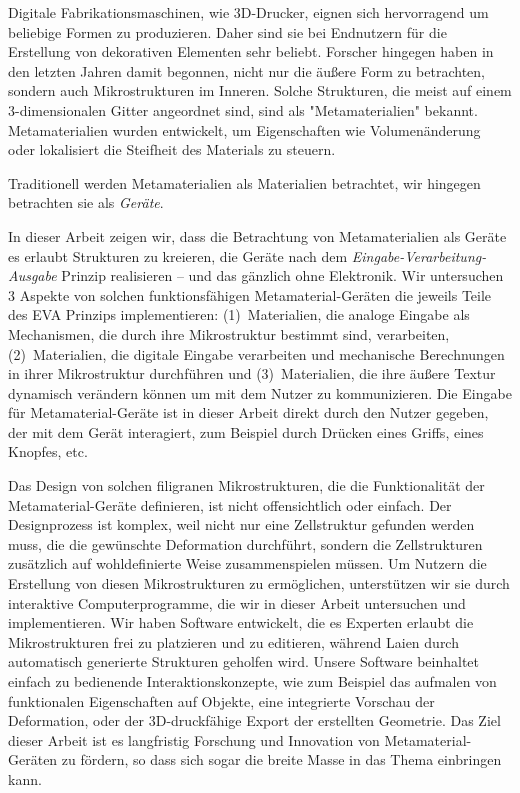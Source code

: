 
Digitale Fabrikationsmaschinen, wie 3D-Drucker, eignen sich hervorragend um beliebige Formen zu produzieren. 
Daher sind sie bei Endnutzern für die Erstellung von dekorativen Elementen sehr beliebt. 
Forscher hingegen haben in den letzten Jahren damit begonnen, nicht nur die äußere Form zu betrachten, sondern auch Mikrostrukturen im Inneren. 
Solche Strukturen, die meist auf einem 3-dimensionalen Gitter angeordnet sind, sind als "Metamaterialien" bekannt.
Metamaterialien wurden entwickelt, um Eigenschaften wie Volumenänderung oder lokalisiert die Steifheit des Materials zu steuern.

Traditionell werden Metamaterialien als Materialien betrachtet, wir hingegen betrachten sie als \textit{Geräte}.

In dieser Arbeit zeigen wir, dass die Betrachtung von Metamaterialien als Geräte es erlaubt Strukturen zu kreieren, die Geräte nach dem \textit{Eingabe-Verarbeitung-Ausgabe} Prinzip realisieren -- und das gänzlich ohne Elektronik.
Wir untersuchen 3 Aspekte von solchen funktionsfähigen Meta\-material-Geräten die jeweils Teile des EVA Prinzips implementieren: 
(1)~Materialien, die analoge Eingabe als Mechanismen, die durch ihre Mikrostruktur bestimmt sind, verarbeiten, 
(2)~Materialien, die digitale Eingabe verarbeiten und mechanische Berechnungen in ihrer Mikrostruktur durchführen und 
(3)~Materialien, die ihre äußere Textur dynamisch verändern können um mit dem Nutzer zu kommunizieren.
Die Eingabe für Meta\-ma\-te\-rial-Geräte ist in dieser Arbeit direkt durch den Nutzer gegeben, der mit dem Gerät interagiert, zum Beispiel durch Drücken eines Griffs, eines Knopfes, etc.

Das Design von solchen filigranen Mikrostrukturen, die die Funktionalität der Metamaterial-Geräte definieren, ist nicht offensichtlich oder einfach.
Der Designprozess ist komplex, weil nicht nur eine Zellstruktur gefunden werden muss, die die gewünschte Deformation durchführt, sondern die Zellstrukturen zusätzlich auf wohldefinierte Weise zusammenspielen müssen. 
Um Nutzern die Erstellung von diesen Mikrostrukturen zu ermöglichen, unterstützen wir sie durch interaktive Computerprogramme, die wir in dieser Arbeit untersuchen und implementieren. 
Wir haben Software entwickelt, die es Experten erlaubt die Mikrostrukturen frei zu plat\-zieren und zu editieren, während Laien durch automatisch generierte Strukturen geholfen wird. 
Unsere Software beinhaltet einfach zu bedienende Interaktionskonzepte, wie zum Beispiel das aufmalen von funktionalen Eigenschaften auf Objekte, eine integrierte Vorschau der Deformation, oder der 3D-druckfähige Export der erstellten Geometrie. 
Das Ziel dieser Arbeit ist es langfristig Forschung und Innovation von Metamaterial-Geräten zu fördern, so dass sich sogar die breite Masse in das Thema einbringen kann. 
